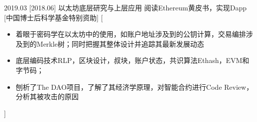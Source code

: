 \documentclass[zh]{resume}
\begin{document}
\begin{experiences}
    \separator{0.2em}
    \experience
    {2019.03}
    [2018.06]%
    {以太坊底层研究与上层应用}%
    {阅读Ethereum黄皮书，实现Dapp}%
    [中国博士后科学基金特别资助]%
    [\begin{itemize}
      \item{\icon{\faFlag}} 着眼于密码学在以太坊中的使用，如账户地址涉及到的公钥计算，交易编排涉及到的Merkle树；同时把握其整体设计并追踪其最新发展动态
      \item{\icon{\faFlag}} 底层编码技术RLP，区块设计，叔块，账户状态，共识算法Ethash，EVM和字节码；
      \item{\icon{\faCheck}} 刨析了The DAO项目，了解了其经济学原理，对智能合约进行Code Review，分析其被攻击的原因
    \end{itemize}]%

\end{experiences}
\end{document}
